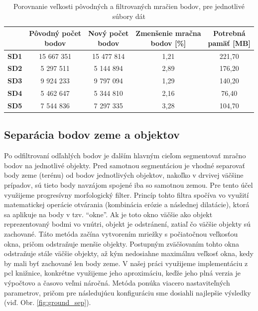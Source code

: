\begin{table}
    \begin{center}
        \begin{tabular}{|c || c | c | c| c|} 
         \hline
         &  \thead{Pôvodný počet \\ bodov} &
            \thead{Nový počet \\ bodov} &
            \thead{Zmenšenie mračna \\ bodov [\%]} &
            \thead{Potrebná \\ pamäť [MB]} \\ [0.5ex] 
         \hline\hline
         \textbf{SD1} & 15 667 351 & 15 477 814 & 1,21 & 221,70 \\ 
         \hline
         \textbf{SD2} & 5 297 511 & 5 144 894 & 2,89 & 176,20 \\
         \hline
         \textbf{SD3} &  9 924 233 & 9 797 094 & 1,29 & 140,20 \\
         \hline
         \textbf{SD4} & 5 462 647 & 5 344 810 & 2,16 & 76,40 \\
         \hline
         \textbf{SD5} & 7 544 836 & 7 297 335 & 3,28 & 104,70 \\
         \hline
        \end{tabular}
    \caption{Porovnanie veľkosti pôvodných a filtrovaných mračien bodov, pre jednotlivé súbory dát}
    \end{center}
\end{table}

\subsection{Separácia bodov zeme a objektov}
\noindent Po odfiltrovaní odľahlých bodov je ďalším hlavným cieľom segmentovať mračno bodov na jednotlivé objekty. Pred samotnou segmentáciou je vhodné separovať body zeme (terénu) od bodov jednotlivých objektov, nakoľko v drvivej väčšine prípadov, sú tieto body navzájom spojené iba so samotnou zemou.
\newline\indent Pre tento účel využijeme progresívny morfologický filter. Princíp tohto filtra spočíva vo využití matematickej operácie otvárania (kombinácia erózie a následnej dilatácie), ktorá sa aplikuje na body v tzv. “okne”. Ak je toto okno väčšie ako objekt reprezentovaný bodmi vo vnútri, objekt je odstránení, zatiaľ čo väčšie objekty sú zachované. Táto metóda začína vytvorením mriežky s počiatočnou veľkosťou okna, pričom odstraňuje menšie objekty. Postupným zväčšovaním tohto okna odstraňuje stále väčšie objekty, až kým nedosiahne maximálnu veľkosť okna, kedy by mali byť zachované len body zeme. \cite{morph_filter}
\newline\indent V našej práci využijeme implementáciu z \acrshort{pcl} knižnice, konkrétne využijeme jeho aproximáciu, keďže jeho plná verzia je výpočtovo a časovo veľmi náročná. Metóda ponúka viacero nastaviteľných parametrov, pričom pre následujúcu konfiguráciu sme dosiahli najlepšie výsledky (viď. Obr. \ref{fig:ground_sep}). 


